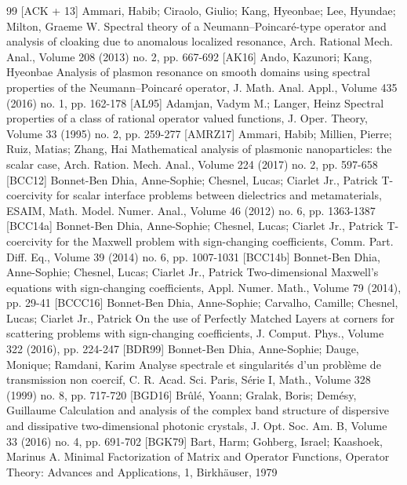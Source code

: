 \begin{thebibliography}{99}
 [ACK + 13] Ammari, Habib; Ciraolo, Giulio; Kang, Hyeonbae; Lee, Hyundae; Milton, Graeme W. Spectral theory of a Neumann–Poincaré-type operator and analysis of cloaking due to anomalous localized resonance, Arch. Rational Mech. Anal., Volume 208 (2013) no. 2, pp. 667-692
 [AK16] Ando, Kazunori; Kang, Hyeonbae Analysis of plasmon resonance on smooth domains using spectral properties of the Neumann–Poincaré operator, J. Math. Anal. Appl., Volume 435 (2016) no. 1, pp. 162-178
 [AL95] Adamjan, Vadym M.; Langer, Heinz Spectral properties of a class of rational operator valued functions, J. Oper. Theory, Volume 33 (1995) no. 2, pp. 259-277
 [AMRZ17] Ammari, Habib; Millien, Pierre; Ruiz, Matias; Zhang, Hai Mathematical analysis of plasmonic nanoparticles: the scalar case, Arch. Ration. Mech. Anal., Volume 224 (2017) no. 2, pp. 597-658
 [BCC12] Bonnet-Ben Dhia, Anne-Sophie; Chesnel, Lucas; Ciarlet Jr., Patrick T-coercivity for scalar interface problems between dielectrics and metamaterials, ESAIM, Math. Model. Numer. Anal., Volume 46 (2012) no. 6, pp. 1363-1387
 [BCC14a] Bonnet-Ben Dhia, Anne-Sophie; Chesnel, Lucas; Ciarlet Jr., Patrick T-coercivity for the Maxwell problem with sign-changing coefficients, Comm. Part. Diff. Eq., Volume 39 (2014) no. 6, pp. 1007-1031
 [BCC14b] Bonnet-Ben Dhia, Anne-Sophie; Chesnel, Lucas; Ciarlet Jr., Patrick Two-dimensional Maxwell’s equations with sign-changing coefficients, Appl. Numer. Math., Volume 79 (2014), pp. 29-41
 [BCCC16] Bonnet-Ben Dhia, Anne-Sophie; Carvalho, Camille; Chesnel, Lucas; Ciarlet Jr., Patrick On the use of Perfectly Matched Layers at corners for scattering problems with sign-changing coefficients, J. Comput. Phys., Volume 322 (2016), pp. 224-247
 [BDR99] Bonnet-Ben Dhia, Anne-Sophie; Dauge, Monique; Ramdani, Karim Analyse spectrale et singularités d’un problème de transmission non coercif, C. R. Acad. Sci. Paris, Série I, Math., Volume 328 (1999) no. 8, pp. 717-720
 [BGD16] Brûlé, Yoann; Gralak, Boris; Demésy, Guillaume Calculation and analysis of the complex band structure of dispersive and dissipative two-dimensional photonic crystals, J. Opt. Soc. Am. B, Volume 33 (2016) no. 4, pp. 691-702
 [BGK79] Bart, Harm; Gohberg, Israel; Kaashoek, Marinus A. Minimal Factorization of Matrix and Operator Functions, Operator Theory: Advances and Applications, 1, Birkhäuser, 1979

\end{thebibliography}
